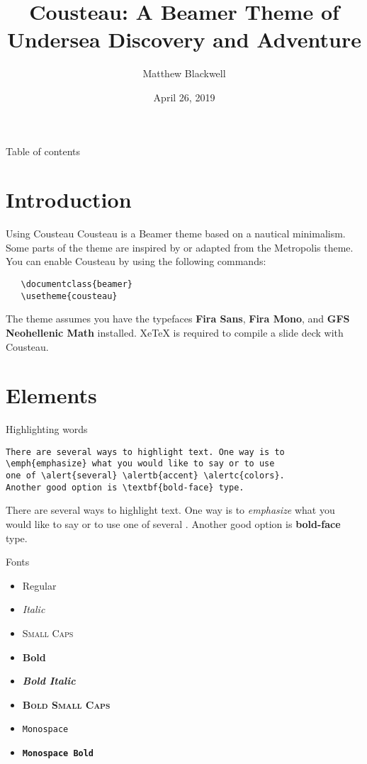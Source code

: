 \documentclass{beamer}
\title{Cousteau: A Beamer Theme of Undersea Discovery and Adventure}
\author{Matthew Blackwell}
\institute{Harvard University}
\date{April 26, 2019}
\begin{document}
\frame{\titlepage}


\begin{frame}{Table of contents}
  \tableofcontents
\end{frame}

\section{Introduction}

\begin{frame}[fragile]{Using Cousteau}
  Cousteau is a Beamer theme based on a nautical minimalism. Some parts of the theme are inspired by or adapted from the Metropolis theme. You can enable Cousteau by using the following commands:
\begin{verbatim}
   \documentclass{beamer}
   \usetheme{cousteau}
\end{verbatim}
  The theme assumes you have the typefaces \textbf{Fira Sans}, \textbf{Fira Mono}, and \textbf{GFS Neohellenic Math} installed. XeTeX is required to compile a slide deck with Cousteau.
\end{frame}


\section{Elements}

\begin{frame}[fragile]{Highlighting words}

\begin{verbatim}
There are several ways to highlight text. One way is to 
\emph{emphasize} what you would like to say or to use 
one of \alert{several} \alertb{accent} \alertc{colors}. 
Another good option is \textbf{bold-face} type. 
\end{verbatim}

  \bigskip
  
  There are several ways to highlight text. One way is to \emph{emphasize} what you would like to say or to use one of \alert{several}  . Another good option is \textbf{bold-face} type. 
  
\end{frame}

\begin{frame}{Fonts}
  \begin{itemize}
    \item Regular
    \item \textit{Italic}
    \item \textsc{Small Caps}
    \item \textbf{Bold}
    \item \textbf{\textit{Bold Italic}}
    \item \textbf{\textsc{Bold Small Caps}}
    \item \texttt{Monospace}
    \item \texttt{\textbf{Monospace Bold}}
  \end{itemize}
  
\end{frame}
\end{document}
